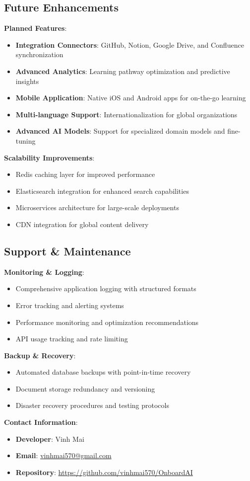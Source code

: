 \documentclass[a4paper,11pt]{article}
\begin{document}
\subsection{Future Enhancements}

\textbf{Planned Features}:
\begin{itemize}
    \item \textbf{Integration Connectors}: GitHub, Notion, Google Drive, and Confluence synchronization
    \item \textbf{Advanced Analytics}: Learning pathway optimization and predictive insights
    \item \textbf{Mobile Application}: Native iOS and Android apps for on-the-go learning
    \item \textbf{Multi-language Support}: Internationalization for global organizations
    \item \textbf{Advanced AI Models}: Support for specialized domain models and fine-tuning
\end{itemize}

\textbf{Scalability Improvements}:
\begin{itemize}
    \item Redis caching layer for improved performance
    \item Elasticsearch integration for enhanced search capabilities
    \item Microservices architecture for large-scale deployments
    \item CDN integration for global content delivery
\end{itemize}

\subsection{Support \& Maintenance}

\textbf{Monitoring \& Logging}:
\begin{itemize}
    \item Comprehensive application logging with structured formats
    \item Error tracking and alerting systems
    \item Performance monitoring and optimization recommendations
    \item API usage tracking and rate limiting
\end{itemize}

\textbf{Backup \& Recovery}:
\begin{itemize}
    \item Automated database backups with point-in-time recovery
    \item Document storage redundancy and versioning
    \item Disaster recovery procedures and testing protocols
\end{itemize}

\textbf{Contact Information}:
\begin{itemize}
    \item \textbf{Developer}: Vinh Mai
    \item \textbf{Email}: \href{mailto:vinhmai570@gmail.com}{vinhmai570@gmail.com}
    \item \textbf{Repository}: \url{https://github.com/vinhmai570/OnboardAI}
\end{itemize}
\end{document}
